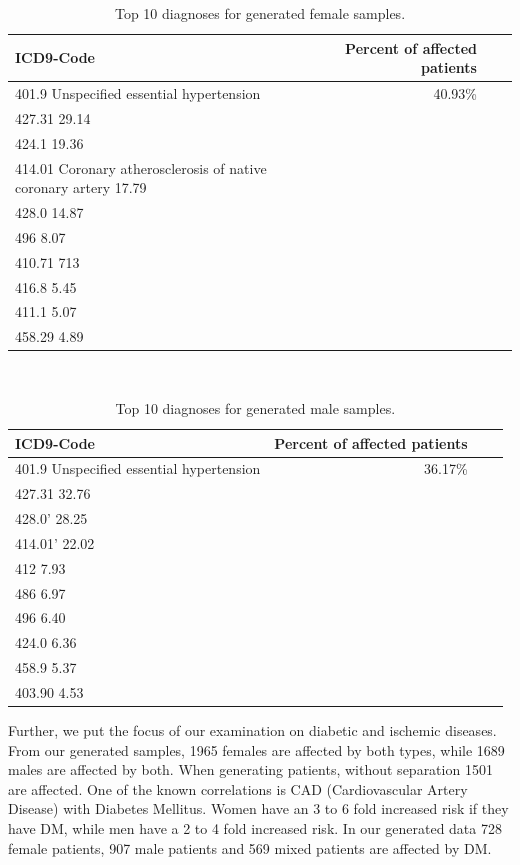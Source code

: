 \documentclass[11pt, a4paper]{book}
\begin{document}
\begin{table}
\begin{tabularx}{\textwidth}{p{}|r|X|r}
\textbf{ICD9-Code} & \textbf{Percent of affected patients}\\
\hline
401.9 Unspecified essential hypertension & 40.93\%\\
427.31 29.14\\
424.1 19.36\\
414.01 Coronary atherosclerosis of native coronary artery 17.79 \\
428.0   14.87\\
496		8.07\\
410.71 713\\
416.8      5.45\\
411.1      5.07\\
458.29     4.89\\
\end{tabularx}
\caption{\label{tab:top10-icd-female}Top 10 diagnoses for generated female samples.}
\end{table}
\\
\begin{table}
\begin{tabularx}{\textwidth}{p{}|r|X|r}
\textbf{ICD9-Code} & \textbf{Percent of affected patients}\\
\hline
401.9 Unspecified essential hypertension & 36.17\%\\
427.31	32.76\\
428.0'     28.25\\
414.01'    22.02\\
412        7.93\\
486        6.97\\
496        6.40\\
424.0      6.36\\
458.9      5.37\\
403.90     4.53\\
\end{tabularx}
\caption{\label{tab:top10-icd-male}Top 10 diagnoses for generated male samples.}
\end{table}
Further, we put the focus of our examination on diabetic and ischemic diseases. 
From our generated samples, 1965 females are affected by both types, while 1689 males are affected by both. When generating patients, without separation 1501 are affected.
One of the known correlations is CAD (Cardiovascular Artery Disease) with Diabetes Mellitus. Women have an 3 to 6 fold increased risk if they have DM, while men have a 2 to 4 fold increased risk. \cite{juutilainen2004gender}
In our generated data 728 female patients, 907 male patients and 569 mixed patients are affected by DM.
\end{document}
